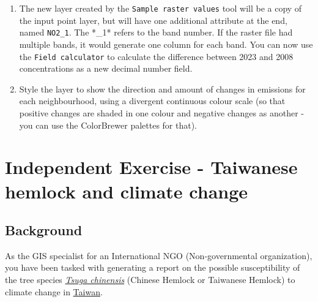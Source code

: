 \documentclass[
  letterpaper,
  DIV=11,
  numbers=noendperiod]{scrreprt}
\begin{document}
\begin{enumerate}
\def\labelenumi{(\arabic{enumi})}
\setcounter{enumi}{327}
\item
  The new layer created by the \texttt{Sample\ raster\ values} tool will
  be a copy of the input point layer, but will have one additional
  attribute at the end, named \texttt{NO2\_1}. The *\_1* refers to the
  band number. If the raster file had multiple bands, it would generate
  one column for each band. You can now use the
  \texttt{Field\ calculator} to calculate the difference between 2023
  and 2008 concentrations as a new decimal number field.
\item
  Style the layer to show the direction and amount of changes in
  emissions for each neighbourhood, using a divergent continuous colour
  scale (so that positive changes are shaded in one colour and negative
  changes as another - you can use the ColorBrewer palettes for that).
\end{enumerate}

\section{Independent Exercise - Taiwanese hemlock and climate
change}\label{independent-exercise---taiwanese-hemlock-and-climate-change}

\subsection{Background}\label{background}

As the GIS specialist for an International NGO (Non-governmental
organization), you have been tasked with generating a report on the
possible susceptibility of the tree species
\href{https://en.wikipedia.org/wiki/Tsuga_chinensis}{\emph{Tsuga
chinensis}} (Chinese Hemlock or Taiwanese Hemlock) to climate change in
\href{https://en.wikipedia.org/wiki/Taiwan}{Taiwan}.
\end{document}

